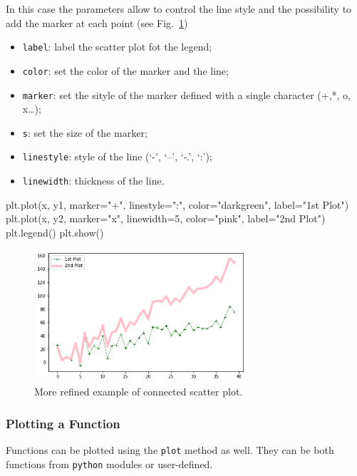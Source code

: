 In this case the parameters allow to control the line style and the possibility to add the marker at each point (see Fig.~\ref{fig:plot2})

\begin{itemize}
\tightlist
\item \texttt{label}: label the scatter plot fot the legend;
\item \texttt{color}: set the color of the marker and the line;
\item \texttt{marker}: set the sityle of the marker defined with a single character (+,*, o, x\ldots{});
\item \texttt{s}: set the size of the marker;
\item \texttt{linestyle}: style of the line (`-', `--', `-.', `:');
\item \texttt{linewidth}: thickness of the line.
\end{itemize}

\begin{ipython}
plt.plot(x, y1, marker="+", linestyle=":", color="darkgreen", label="1st Plot")
plt.plot(x, y2, marker="x", linewidth=5, color="pink", label="2nd Plot")
plt.legend()
plt.show()
\end{ipython}

\begin{figure}[htb]
	\centering
	\includegraphics[width=0.7\textwidth]{figures/plot2}
	\caption{More refined example of connected scatter plot.}
	\label{fig:plot2}
\end{figure}

\subsubsection{Plotting a Function}\label{plotting-a-function}

Functions can be plotted using the \texttt{plot} method as well. They can be both functions from \texttt{python} modules or user-defined.

